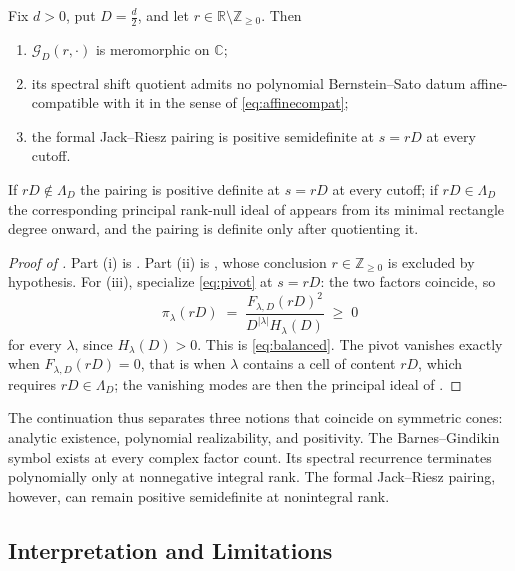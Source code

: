 \documentclass[11pt,letterpaper]{article}
\newcommand{\Gc}{\mathcal{G}}               %
\newcommand{\Zint}{\mathbb{Z}}
\newcommand{\Rr}{\mathbb{R}}
\newcommand{\Cc}{\mathbb{C}}
\begin{document}
\begin{corollary}
\label{cor:separation}
Fix $d>0$, put $D=\tfrac d2$, and let $r\in\Rr\setminus\Zint_{\ge0}$. Then
\begin{enumerate}
\item[(i)] $\Gc_D(r,\cdot)$ is meromorphic on $\Cc$;
\item[(ii)] its spectral shift quotient admits no polynomial Bernstein--Sato
  datum affine-compatible with it in the sense of \eqref{eq:affinecompat};
\item[(iii)] the formal Jack--Riesz pairing is positive semidefinite at $s=rD$ at
  every cutoff.
\end{enumerate}
If $rD\notin\Lambda_D$ the pairing is positive definite at $s=rD$ at every
cutoff; if $rD\in\Lambda_D$ the corresponding principal rank-null ideal of
 appears from its minimal rectangle degree onward, and the
pairing is definite only after quotienting it.
\end{corollary}

\begin{proof}[Proof of ]
Part (i) is . Part (ii) is , whose conclusion
$r\in\Zint_{\ge0}$ is excluded by hypothesis. For (iii), specialize
\eqref{eq:pivot} at $s=rD$: the two factors coincide, so
\begin{equation*}
  \pi_\lambda(rD)\;=\;\frac{F_{\lambda,D}(rD)^{2}}{D^{|\lambda|}H_\lambda(D)}\;\ge\;0
\end{equation*}
for every $\lambda$, since $H_\lambda(D)>0$. This is \eqref{eq:balanced}. The
pivot vanishes exactly when $F_{\lambda,D}(rD)=0$, that is when $\lambda$ contains
a cell of content $rD$, which requires $rD\in\Lambda_D$; the vanishing modes are
then the principal ideal of .
\end{proof}

The continuation thus separates three notions that coincide on symmetric cones:
analytic existence, polynomial realizability, and positivity. The
Barnes--Gindikin symbol exists at every complex factor count. Its spectral
recurrence terminates polynomially only at nonnegative integral rank. The formal
Jack--Riesz pairing, however, can remain positive semidefinite at nonintegral
rank.

\subsection{Interpretation and Limitations}
\end{document}
